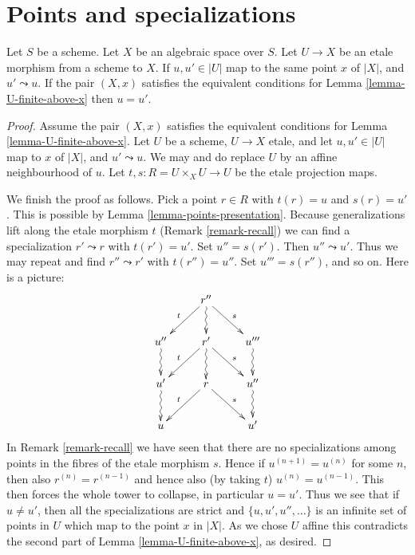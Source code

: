 \section{Points and specializations}
\label{section-specializations}

\begin{lemma}
\label{lemma-no-specializations-map-to-same-point}
Let $S$ be a scheme.
Let $X$ be an algebraic space over $S$.
Let $U \to X$ be an etale morphism from a scheme to $X$.
If $u, u' \in |U|$ map to the same point $x$ of $|X|$, and
$u' \leadsto u$. If the pair $(X, x)$ satisfies the
equivalent conditions for Lemma \ref{lemma-U-finite-above-x}
then $u = u'$.
\end{lemma}

\begin{proof}
Assume the pair $(X, x)$ satisfies the
equivalent conditions for Lemma \ref{lemma-U-finite-above-x}.
Let $U$ be a scheme, $U \to X$ etale, and
let $u, u' \in |U|$ map to $x$ of $|X|$, and
$u' \leadsto u$. We may and do replace $U$ by an affine
neighbourhood of $u$. Let $t, s : R = U \times_X U \to U$
be the etale projection maps.

\medskip\noindent
We finish the proof as follows.
Pick a point $r \in R$ with $t(r) = u$ and $s(r) = u'$.
This is possible by
Lemma \ref{lemma-points-presentation}.
Because generalizations lift along the etale morphism $t$
(Remark \ref{remark-recall}) we can find a specialization $r' \leadsto r$ with
$t(r') = u'$. Set $u'' = s(r')$. Then $u'' \leadsto u'$.
Thus we may repeat and find $r'' \leadsto r'$ with
$t(r'') = u''$. Set $u''' = s(r'')$, and so on.
Here is a picture:
$$
\xymatrix{
& r'' \ar[rd]^s \ar[ld]_t \ar@{~>}[d] & \\
u'' \ar@{~>}[d] & r' \ar[rd]^s \ar[ld]_t \ar@{~>}[d] & u''' \ar@{~>}[d] \\
u' \ar@{~>}[d] & r \ar[rd]^s \ar[ld]_t & u'' \ar@{~>}[d] \\
u & & u'
}
$$
In Remark \ref{remark-recall} we have seen that there are no specializations
among points in the fibres of the etale morphism $s$. Hence if
$u^{(n + 1)} = u^{(n)}$ for some $n$, then also $r^{(n)} = r^{(n - 1)}$ and
hence also (by taking $t$) $u^{(n)} = u^{(n - 1)}$. This then forces the
whole tower to collapse, in particular $u = u'$. Thus we see that if
$u \not = u'$, then all the specializations are strict and
$\{u, u', u'', \ldots\}$ is an infinite set of points in $U$ which map to the
point $x$ in $|X|$. As we chose $U$ affine this contradicts the second part of
Lemma \ref{lemma-U-finite-above-x}, as desired.
\end{proof}

